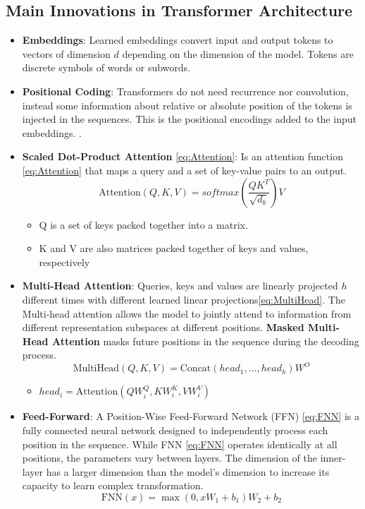 \subsection{Main Innovations in Transformer Architecture}  
\begin{itemize}
    \item \textbf{Embeddings}: Learned embeddings convert input and output tokens to vectors of dimension $d$ depending on the dimension of the model. Tokens are discrete symbols of words or subwords.
    
    \item \textbf{Positional Coding}:  
    Transformers do not need recurrence nor convolution, instead some information about relative or absolute position of the tokens is injected in the sequences. This is the positional encodings added to the input embeddings. \cite{vaswani2017attention}.  
    \item  \textbf{Scaled Dot-Product Attention} \ref{eq:Attention}: Is an attention function \ref{eq:Attention} that maps a query and a set of key-value pairs to an output.
    \begin{equation}
        \label{eq:Attention}
        \text{Attention}(Q,K,V) = softmax(\frac{QK^T}{\sqrt{d_k}})V 
    \end{equation} 
    \begin{itemize}
        \item Q is a set of keys packed together into a matrix.
        \item K and V are also matrices packed together of keys and values, respectively
    \end{itemize}
    \item \textbf{Multi-Head Attention}:  Queries, keys and values are linearly projected $h$ different times with different learned linear projections\ref{eq:MultiHead}. The Multi-head attention allows the model to jointly attend to information from different representation subspaces at different positions. \textbf{Masked Multi-Head Attention} masks future positions in the sequence during the decoding process\cite{vaswani2017attention}.
    \begin{equation}
        \label{eq:MultiHead}
        \text{MultiHead}(Q,K,V) = \text{Concat}(head_1, ..., head_h)W^O  
    \end{equation}
    \begin{itemize}
        \item $head_i = \text{Attention}(QW_i^Q, KW_i^K,VW_i^V)$
    \end{itemize}
    \item \textbf{Feed-Forward}:  A Position-Wise Feed-Forward Network (FFN) \ref{eq:FNN} is a fully connected neural network designed to independently process each position in the sequence.  While FNN \ref{eq:FNN} operates identically at all positions, the parameters vary between layers. The dimension of the inner-layer has a larger dimension than the model's dimension to increase its capacity to learn complex transformation\cite{vaswani2017attention}.
    \begin{equation}
        \label{eq:FNN}
        \text{FNN}(x) = \max(0,xW_1+b_1)W_2+b_2
    \end{equation}
\end{itemize}
